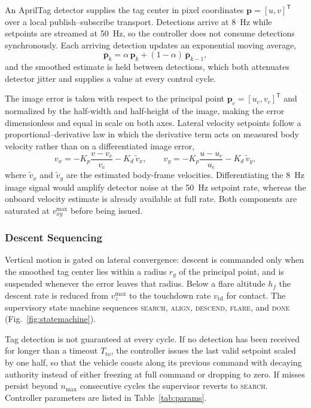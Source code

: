 An AprilTag detector supplies the tag center in pixel coordinates
$\mathbf{p} = [u, v]^{\mathsf{T}}$ over a local publish--subscribe transport.
Detections arrive at \SI{8}{\hertz} while setpoints are streamed at
\SI{50}{\hertz}, so the controller does not consume detections synchronously.
Each arriving detection updates an exponential moving average,
\begin{equation}
  \bar{\mathbf{p}}_k = \alpha\, \mathbf{p}_k + (1-\alpha)\, \bar{\mathbf{p}}_{k-1},
  \label{eq:ema}
\end{equation}
and the smoothed estimate is held between detections, which both attenuates
detector jitter and supplies a value at every control cycle.

The image error is taken with respect to the principal point
$\mathbf{p}_c = [u_c, v_c]^{\mathsf{T}}$ and normalized by the half-width and
half-height of the image, making the error dimensionless and equal in scale on
both axes. Lateral velocity setpoints follow a proportional--derivative law in
which the derivative term acts on measured body velocity rather than on a
differentiated image error,
\begin{equation}
  v_x = -K_p \frac{v - v_c}{v_c} - K_d\, \tilde{v}_x ,
  \qquad
  v_y = -K_p \frac{u - u_c}{u_c} - K_d\, \tilde{v}_y ,
  \label{eq:pd}
\end{equation}
where $\tilde{v}_x$ and $\tilde{v}_y$ are the estimated body-frame velocities.
Differentiating the \SI{8}{\hertz} image signal would amplify detector noise at
the \SI{50}{\hertz} setpoint rate, whereas the onboard velocity estimate is
already available at full rate. Both components are saturated at
$v^{\max}_{xy}$ before being issued.

\subsubsection{Descent Sequencing}

Vertical motion is gated on lateral convergence: descent is commanded only when
the smoothed tag center lies within a radius $r_g$ of the principal point, and is
suspended whenever the error leaves that radius. Below a flare altitude
$h_f$ the descent rate is reduced from $v^{\max}_{z}$ to the touchdown rate
$v_{\mathrm{td}}$ for contact. The supervisory state machine sequences
\textsc{search}, \textsc{align}, \textsc{descend}, \textsc{flare}, and
\textsc{done} (Fig.~\ref{fig:statemachine}).

Tag detection is not guaranteed at every cycle. If no detection has been received
for longer than a timeout $T_{\mathrm{to}}$, the controller issues the last valid
setpoint scaled by one half, so that the vehicle coasts along its previous
command with decaying authority instead of either freezing at full command or
dropping to zero. If misses persist beyond $n_{\max}$ consecutive cycles the
supervisor reverts to \textsc{search}. Controller parameters are listed in
Table~\ref{tab:params}.

